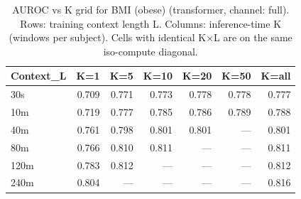 \begin{table}[ht]
\centering
\caption{AUROC vs K grid for BMI (obese) (transformer, channel: full). Rows: training context length L. Columns: inference-time K (windows per subject). Cells with identical K×L are on the same iso-compute diagonal.}
\label{tab:kgrid_bmi_binary_transformer_full}
\begin{tabular}{lrrrrrr}
\toprule
Context_L & K=1 & K=5 & K=10 & K=20 & K=50 & K=all \\
\midrule
30s & 0.709 & 0.771 & 0.773 & 0.778 & 0.778 & 0.777 \\
10m & 0.719 & 0.777 & 0.785 & 0.786 & 0.789 & 0.788 \\
40m & 0.761 & 0.798 & 0.801 & 0.801 & — & 0.801 \\
80m & 0.766 & 0.810 & 0.811 & — & — & 0.811 \\
120m & 0.783 & 0.812 & — & — & — & 0.812 \\
240m & 0.804 & — & — & — & — & 0.816 \\
\bottomrule
\end{tabular}
\end{table}